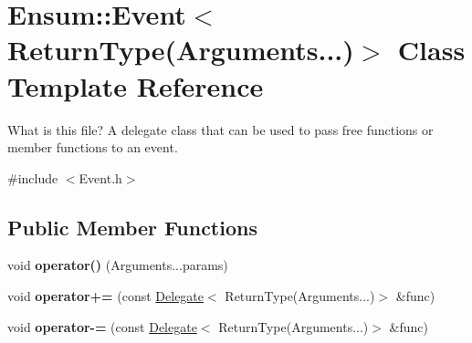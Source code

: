 \hypertarget{class_ensum_1_1_event_3_01_return_type_07_arguments_8_8_8_08_4}{}\section{Ensum\+:\+:Event$<$ Return\+Type(Arguments...)$>$ Class Template Reference}
\label{class_ensum_1_1_event_3_01_return_type_07_arguments_8_8_8_08_4}


What is this file? A delegate class that can be used to pass free functions or member functions to an event.  




{\ttfamily \#include $<$Event.\+h$>$}

\subsection*{Public Member Functions}
\begin{DoxyCompactItemize}
\item 
void {\bfseries operator()} (Arguments...\+params)\hypertarget{class_ensum_1_1_event_3_01_return_type_07_arguments_8_8_8_08_4_add7c448f8cc9a82ee4f3a533f549f092}{}\label{class_ensum_1_1_event_3_01_return_type_07_arguments_8_8_8_08_4_add7c448f8cc9a82ee4f3a533f549f092}

\item 
void {\bfseries operator+=} (const \hyperlink{class_ensum_1_1_delegate}{Delegate}$<$ Return\+Type(Arguments...)$>$ \&func)\hypertarget{class_ensum_1_1_event_3_01_return_type_07_arguments_8_8_8_08_4_a9d0c7cffb5c1b1340f312a88fd3f06ce}{}\label{class_ensum_1_1_event_3_01_return_type_07_arguments_8_8_8_08_4_a9d0c7cffb5c1b1340f312a88fd3f06ce}

\item 
void {\bfseries operator-\/=} (const \hyperlink{class_ensum_1_1_delegate}{Delegate}$<$ Return\+Type(Arguments...)$>$ \&func)\hypertarget{class_ensum_1_1_event_3_01_return_type_07_arguments_8_8_8_08_4_a17b8e30ebf66d670d9afc31568b64c01}{}\label{class_ensum_1_1_event_3_01_return_type_07_arguments_8_8_8_08_4_a17b8e30ebf66d670d9afc31568b64c01}

\end{DoxyCompactItemize}
